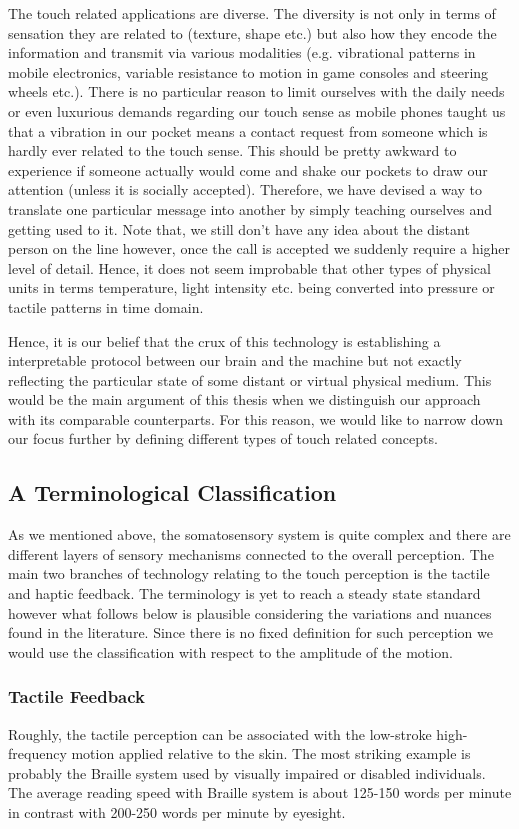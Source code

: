 The touch related applications are diverse. The diversity is not only in terms of sensation they are related to (texture, shape etc.) but also how they encode the information and transmit via various modalities (e.g. vibrational patterns in mobile electronics, variable resistance to motion in game consoles and steering wheels etc.). There is no particular reason to limit ourselves with the daily needs or even luxurious demands regarding our touch sense as mobile phones taught us that a vibration in our pocket means a contact request from someone which is hardly ever related to the touch sense. This should be pretty awkward to experience if someone actually would come and shake our pockets to draw our attention (unless it is socially accepted). Therefore, we have devised a way to translate one particular message into another by simply teaching ourselves and getting used to it. Note that, we still don't have any idea about the distant person on the line however, once the call is accepted we suddenly require a higher level of detail. Hence, it does not seem improbable that other types of physical units in terms temperature, light intensity etc. being converted into pressure or tactile patterns in time domain.

Hence, it is our belief that the crux of this technology is establishing a interpretable protocol between our brain and the machine but not exactly reflecting the particular state of some distant or virtual physical medium. 
This would be the main argument of this thesis when we distinguish our approach with its comparable counterparts. For this reason, we would like to narrow down our focus further by defining different types of touch related concepts.

\subsection{A Terminological Classification}

As we mentioned above, the somatosensory system is quite complex and there are different layers of sensory mechanisms connected to the overall perception. The main two branches of technology relating to the touch perception is the tactile and haptic feedback. The terminology is yet to reach a steady state standard however what follows below is plausible considering the variations and nuances found in the literature. Since there is no fixed definition for such perception we would use the classification with respect to the amplitude of the motion. 
\subsubsection{Tactile Feedback}
Roughly, the tactile perception can be associated with the low-stroke high-frequency motion applied relative to the skin. The most striking example is probably the Braille system used by visually impaired or disabled individuals. The average reading speed with Braille system is about 125-150 words per minute \cite{americanblind} in contrast with 200-250 words per minute by eyesight. 

